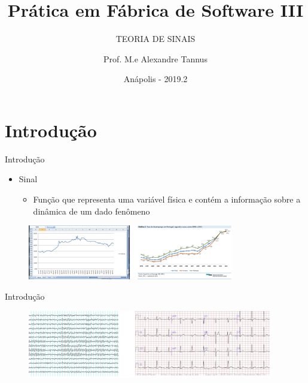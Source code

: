 \documentclass[aspectratio=169,
				xcolor=table]{beamer}
\institute[]{\uppercase{Engenharia de Computação}}
\title[]{Prática em Fábrica de Software III}
\subtitle[]{\uppercase{Teoria de Sinais}}
\author[]{Prof. M.e Alexandre Tannus}
\date{Anápolis - 2019.2}
\begin{document}
	\begin{frame}
		\titlepage		
	\end{frame}

	\begin{frame}
		\tableofcontents
	\end{frame}	

	\section{Introdução}
	\begin{frame}{Introdução}
		\begin{itemize}
			\item Sinal
			\begin{itemize}
				\item Função que representa uma variável física e contém a informação sobre a dinâmica de um dado fenômeno
			\end{itemize}
		\end{itemize}
		
		\begin{figure}[hbtp]
		\centering
		\includegraphics[width=0.8\textwidth, keepaspectratio]{../figs/cap01/sinal01.png}
		\end{figure}
		
	\end{frame}
	
		\begin{frame}{Introdução}
		
		\begin{figure}[hbtp]
		\centering
		\includegraphics[width=0.95\textwidth, keepaspectratio]{../figs/cap01/sinal02.png}
		\end{figure}
		
	\end{frame}
	
\end{document}
